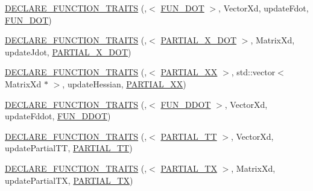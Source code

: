 \begin{DoxyCompactItemize}
\item 
\hyperlink{namespaceocra_adceb125af80fd7dba02d9b96886ae95b}{D\+E\+C\+L\+A\+R\+E\+\_\+\+F\+U\+N\+C\+T\+I\+O\+N\+\_\+\+T\+R\+A\+I\+TS} (,$<$ \hyperlink{namespaceocra_a40ddbec106a6034cd2047bba9945b568a11155229b7dd433fdf99a70d80415591}{F\+U\+N\+\_\+\+D\+OT} $>$, Vector\+Xd, update\+Fdot, \hyperlink{namespaceocra_a40ddbec106a6034cd2047bba9945b568a11155229b7dd433fdf99a70d80415591}{F\+U\+N\+\_\+\+D\+OT})
\item 
\hyperlink{namespaceocra_a2cf1b357a75ff3e26c1107b704b858b4}{D\+E\+C\+L\+A\+R\+E\+\_\+\+F\+U\+N\+C\+T\+I\+O\+N\+\_\+\+T\+R\+A\+I\+TS} (,$<$ \hyperlink{namespaceocra_a40ddbec106a6034cd2047bba9945b568afa9a6f174edaa6ff5736da6a2e542693}{P\+A\+R\+T\+I\+A\+L\+\_\+\+X\+\_\+\+D\+OT} $>$, Matrix\+Xd, update\+Jdot, \hyperlink{namespaceocra_a40ddbec106a6034cd2047bba9945b568afa9a6f174edaa6ff5736da6a2e542693}{P\+A\+R\+T\+I\+A\+L\+\_\+\+X\+\_\+\+D\+OT})
\item 
\hyperlink{namespaceocra_a97b79e91287299ee8819a886b496ab32}{D\+E\+C\+L\+A\+R\+E\+\_\+\+F\+U\+N\+C\+T\+I\+O\+N\+\_\+\+T\+R\+A\+I\+TS} (,$<$ \hyperlink{namespaceocra_a40ddbec106a6034cd2047bba9945b568ad93cbdd745d07fcaa7f8b9f7909464a2}{P\+A\+R\+T\+I\+A\+L\+\_\+\+XX} $>$, std\+::vector$<$ Matrix\+Xd $\ast$ $>$, update\+Hessian, \hyperlink{namespaceocra_a40ddbec106a6034cd2047bba9945b568ad93cbdd745d07fcaa7f8b9f7909464a2}{P\+A\+R\+T\+I\+A\+L\+\_\+\+XX})
\item 
\hyperlink{namespaceocra_a988768361450a5b18c6b2ffa33d4f106}{D\+E\+C\+L\+A\+R\+E\+\_\+\+F\+U\+N\+C\+T\+I\+O\+N\+\_\+\+T\+R\+A\+I\+TS} (,$<$ \hyperlink{namespaceocra_a40ddbec106a6034cd2047bba9945b568ad17fc6e996168c43ed995a3db244e9d5}{F\+U\+N\+\_\+\+D\+D\+OT} $>$, Vector\+Xd, update\+Fddot, \hyperlink{namespaceocra_a40ddbec106a6034cd2047bba9945b568ad17fc6e996168c43ed995a3db244e9d5}{F\+U\+N\+\_\+\+D\+D\+OT})
\item 
\hyperlink{namespaceocra_af019406ee65dbf790826d69afe7096ab}{D\+E\+C\+L\+A\+R\+E\+\_\+\+F\+U\+N\+C\+T\+I\+O\+N\+\_\+\+T\+R\+A\+I\+TS} (,$<$ \hyperlink{namespaceocra_a40ddbec106a6034cd2047bba9945b568ac6983b39fc5bff05d8cfbfe22077628e}{P\+A\+R\+T\+I\+A\+L\+\_\+\+TT} $>$, Vector\+Xd, update\+Partial\+TT, \hyperlink{namespaceocra_a40ddbec106a6034cd2047bba9945b568ac6983b39fc5bff05d8cfbfe22077628e}{P\+A\+R\+T\+I\+A\+L\+\_\+\+TT})
\item 
\hyperlink{namespaceocra_a80ed493e4bf4dcb03e9f101c72fcbacb}{D\+E\+C\+L\+A\+R\+E\+\_\+\+F\+U\+N\+C\+T\+I\+O\+N\+\_\+\+T\+R\+A\+I\+TS} (,$<$ \hyperlink{namespaceocra_a40ddbec106a6034cd2047bba9945b568a4b04a150f971ab6861dfc45470c66945}{P\+A\+R\+T\+I\+A\+L\+\_\+\+TX} $>$, Matrix\+Xd, update\+Partial\+TX, \hyperlink{namespaceocra_a40ddbec106a6034cd2047bba9945b568a4b04a150f971ab6861dfc45470c66945}{P\+A\+R\+T\+I\+A\+L\+\_\+\+TX})

\end{DoxyCompactItemize}
